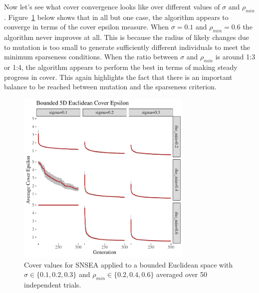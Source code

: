 \documentclass[twoside]{article}
\begin{document}
Now let's see what cover convergence looks like over different values of $\sigma$ and $\rho_{min}$.  Figure~\ref{fig:bounded:nopop:sm} below shows that in all but one case, the algorithm appears to converge in terms of the cover epsilon measure.  When $\sigma=0.1$ and $\rho_{min} = 0.6$ the algorithm never improves at all.  This is because the radius of likely changes due to mutation is too small to generate sufficiently different individuals to meet the minimum sparseness conditions.  When the ratio between $\sigma$ and $\rho_{min}$ is around 1:3 or 1:4, the algorithm appears to perform the best in terms of making steady progress in cover.  This again highlights the fact that there is an important balance to be reached between mutation and the sparseness criterion.
%
\begin{figure}[h]
  \center\includegraphics[width=0.75\textwidth]{Figures/bounded-500sm-NOPOP.pdf}
  \caption{\label{fig:bounded:nopop:sm} Cover values for SNSEA applied to a bounded Euclidean space with $\sigma\in\{0.1,  0.2, 0.3\}$ and $\rho_{min} \in \{0.2, 0.4, 0.6\}$ averaged over 50 independent trials.}
\end{figure}
\end{document}
